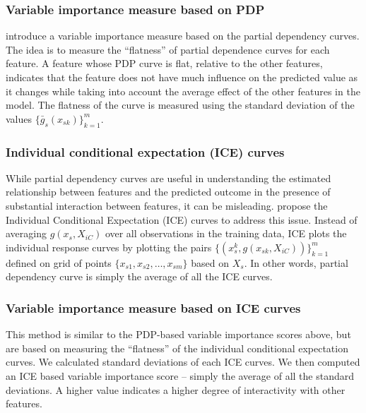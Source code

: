 \documentclass[11pt,a4paper,]{article}
\begin{document}
\subsubsection{Variable importance measure based on
PDP}\label{variable-importance-measure-based-on-pdp}

\textcite{Greenwell2018} introduce a variable importance measure based
on the partial dependency curves. The idea is to measure the
``flatness'' of partial dependence curves for each feature. A feature
whose PDP curve is flat, relative to the other features, indicates that
the feature does not have much influence on the predicted value as it
changes while taking into account the average effect of the other
features in the model. The flatness of the curve is measured using the
standard deviation of the values \(\{\bar{g}_{s}(x_{sk})\}_{k=1}^{m}\).

\subsubsection{Individual conditional expectation (ICE)
curves}\label{individual-conditional-expectation-ice-curves}

While partial dependency curves are useful in understanding the
estimated relationship between features and the predicted outcome in the
presence of substantial interaction between features, it can be
misleading. \textcite{goldstein2015peeking} propose the Individual
Conditional Expectation (ICE) curves to address this issue. Instead of
averaging \(g(x_s, X_{iC})\) over all observations in the training data,
ICE plots the individual response curves by plotting the pairs
\(\{(x_s^k, g(x_{sk}, X_{iC}))\}_{k=1}^{m}\) defined on grid of points
\(\{x_{s1}, x_{s2},\dots, x_{sm}\}\) based on \(X_s\). In other words,
partial dependency curve is simply the average of all the ICE curves.

\subsubsection{Variable importance measure based on ICE
curves}\label{variable-importance-measure-based-on-ice-curves}

This method is similar to the PDP-based variable importance scores
above, but are based on measuring the ``flatness'' of the individual
conditional expectation curves. We calculated standard deviations of
each ICE curves. We then computed an ICE based variable importance score
-- simply the average of all the standard deviations. A higher value
indicates a higher degree of interactivity with other features.
\end{document}
